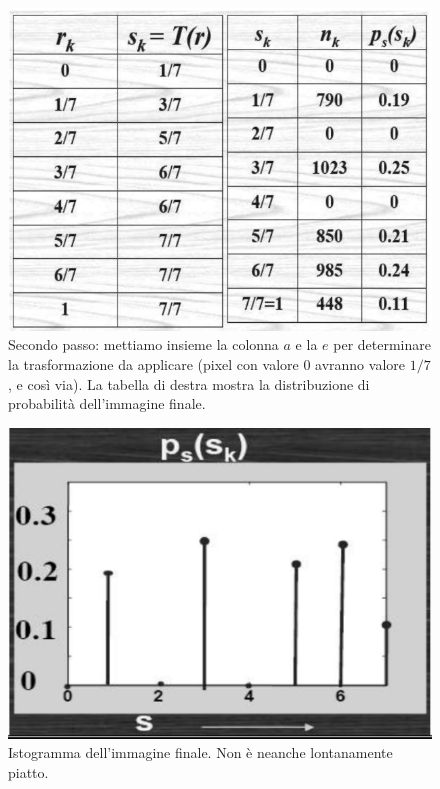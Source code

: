 \documentclass[a4paper,11pt]{article}
\begin{document}
\renewcommand{\thefigure}{5.17}
\begin{figure}[!h]
  \centering
    \includegraphics[scale=0.35]{images/5/eq_example_2.png}
    \caption{Secondo passo: mettiamo insieme la colonna $a$ e la $e$ per determinare la trasformazione da applicare (pixel con valore 0 avranno valore $1/7$, e così via). La tabella di destra mostra la
    distribuzione di probabilità dell'immagine finale.}
\end{figure}

\renewcommand{\thefigure}{5.18}
\begin{figure}[!h]
  \centering
    \includegraphics[scale=0.4]{images/5/eq_example_3.png}
    \caption{Istogramma dell'immagine finale. Non è neanche lontanamente piatto.}
\end{figure}
\end{document}
